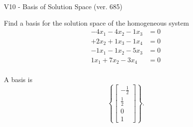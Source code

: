 \begin{exercise}
  \begin{exerciseTitle}V10 - Basis of Solution Space (ver. 685)\end{exerciseTitle}
  \begin{exerciseStatement}
    Find a basis for the solution space of the homogeneous system 
\begin{align*}
 -4 x_ 1 -4 x_ 2 -1 x_ 3 &= 0  \\ 
  + 2 x_ 2 + 1 x_ 3 -1 x_ 4 &= 0  \\ 
  -1 x_ 1 -1 x_ 2 -5 x_ 3 &= 0  \\ 
  1 x_ 1 + 7 x_ 2 -3 x_ 4 &= 0  \\ 
 \end{align*}


 
  \end{exerciseStatement}

  \begin{exerciseAnswer}
   A basis is   
\[\left\{\left[\begin{array}{c}
-\frac{1}{2} \\
\frac{1}{2} \\
0 \\
1
\end{array}\right]\right\}.\]

  


  \end{exerciseAnswer}
\end{exercise}